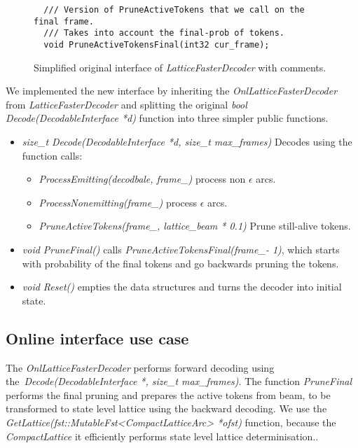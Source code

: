 \begin{figure}[!htp]
\begin{center}
\begin{verbatim}
  /// Version of PruneActiveTokens that we call on the final frame.
  /// Takes into account the final-prob of tokens.
  void PruneActiveTokensFinal(int32 cur_frame);
        \end{verbatim}
        \caption{Simplified original interface of {\it LatticeFasterDecoder}\/ with comments.}
    \label{fig:lattice_decoder} 
    \end{center}
\end{figure}

We implemented the new interface by inheriting the {\it OnlLatticeFasterDecoder}\/ from {\it LatticeFasterDecoder}\/ 
and splitting the original {\it bool Decode(DecodableInterface *d)}\/ function 
into three simpler public functions.
\begin{itemize}
    \item {\it size\_t Decode(DecodableInterface *d, size\_t max\_frames)}\/ 
        Decodes using the function calls:
        \begin{itemize}
            \item {\it ProcessEmitting(decodbale, frame\_)}\/ process non $\epsilon$ arcs.
            \item {\it ProcessNonemitting(frame\_)}\/ process $\epsilon$ arcs.
            \item {\it PruneActiveTokens(frame\_, lattice\_beam * 0.1)}\/ Prune still-alive tokens. 
        \end{itemize}

    \item {\it void PruneFinal()}\/ calls {\it PruneActiveTokensFinal(frame\_- 1)}\/, which starts
        with probability of the final tokens and go backwards pruning the tokens.
    \item {\it void Reset()}\/ empties the data structures and turns the decoder into
        initial state.
\end{itemize}

\subsection*{Online interface use case}
The {\it OnlLatticeFasterDecoder}\/ performs forward decoding using 
the~{\it Decode(DecodableInterface *, size\_t max\_frames)}\/.
The function {\it PruneFinal}\/ performs the final pruning and prepares the active tokens from beam,
to be transformed to state level lattice using the backward decoding.
We use the {\it GetLattice(fst::MutableFst<CompactLatticeArc> *ofst)}\/ function,
because the {\it CompactLattice}\/ it efficiently performs 
state level lattice determinisation.\cite{povey2012generating}.

